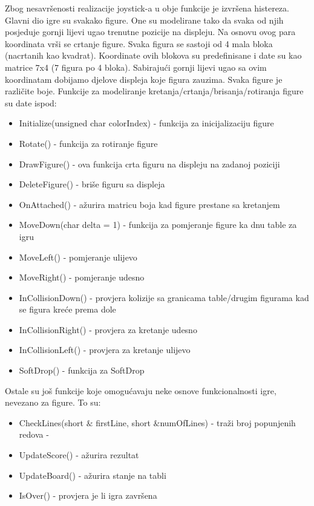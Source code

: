 \documentclass[a4paper,12pt,twoside]{article}
\begin{document}
Zbog nesavršenosti realizacije joystick-a u obje funkcije je izvršena histereza.
\newpage
\noindent Glavni dio igre su svakako figure. One su modelirane tako da svaka od njih posjeduje gornji lijevi ugao trenutne pozicije na displeju. Na osnovu ovog para koordinata vrši se crtanje figure. Svaka figura se sastoji od 4 mala bloka (nacrtanih kao kvadrat). Koordinate ovih blokova su predefinisane i date su kao matrice 7x4 (7 figura po 4 bloka). Sabirajući gornji lijevi ugao sa ovim koordinatam dobijamo djelove displeja koje figura zauzima. Svaka figure je različite boje. Funkcije za modeliranje kretanja/crtanja/brisanja/rotiranja figure su date ispod:
\begin{itemize}
\item Initialize(unsigned char colorIndex) - funkcija za inicijalizaciju figure \textbf{}
\item Rotate() - funkcija za rotiranje figure \textbf{}
\item DrawFigure() - ova funkcija crta figuru na displeju na zadanoj poziciji \textbf{}
\item DeleteFigure() - briše figuru sa displeja  \textbf{}
\item OnAttached() - ažurira matricu boja kad figure prestane sa kretanjem  \textbf{}
\item MoveDown(char delta = 1) - funkcija za pomjeranje figure ka dnu table za igru \textbf{}
\item MoveLeft() - pomjeranje ulijevo \textbf{}
\item MoveRight() - pomjeranje udesno \textbf{}
\item InCollisionDown() - provjera kolizije sa granicama table/drugim figurama kad se figura kreće prema dole \textbf{}
\item InCollisionRight() - provjera za kretanje udesno  \textbf{}
\item InCollisionLeft() - provjera za kretanje ulijevo \textbf{}
\item SoftDrop() - funkcija za SoftDrop \textbf{}
\end{itemize}
Ostale su još funkcije koje omogućavaju neke osnove funkcionalnosti igre, nevezano za figure. To su:
\begin{itemize}
\item CheckLines(short $\&$ firstLine, short $\&$numOfLines) - traži broj popunjenih redova - \textbf{}
\item UpdateScore() - ažurira rezultat \textbf{}
\item UpdateBoard() - ažurira stanje na tabli \textbf{}
\item IsOver() - provjera je li igra završena \textbf{}
\end{itemize}
\end{document}
